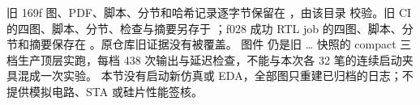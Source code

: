 旧 169f 图、PDF、脚本、分节和哈希记录逐字节保留在
，由该目录  校验。旧  CI 的四图、脚本、分节、检查与摘要另存于 ；f028 成功 RTL job 的四图、脚本、分节和摘要保存在 。原仓库旧证据没有被覆盖。
图件  仍是旧 … 快照的 compact 三档生产顶层实跑，每档 438 次输出与延迟检查，不能与本次各 32 笔的连续启动夹具混成一次实验。
本节没有启动新仿真或 EDA，全部图只重建已归档的日志；不提供模拟电路、STA 或硅片性能签核。
